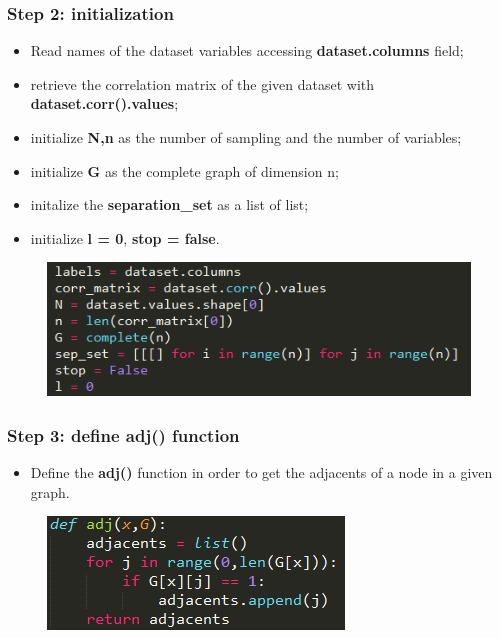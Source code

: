 \documentclass[xcolor ={table,usenames,dvipsnames}]{beamer}
\theoremstyle{definition}
\begin{document}
	\begin{frame}
\frametitle{Step 2: initialization}
\begin{itemize}
	\item Read names of the dataset variables accessing \textbf{dataset.columns} field;
	\item retrieve the correlation matrix of the given dataset with \textbf{dataset.corr().values};
	\item initialize \textbf{N,n} as the number of sampling and the number of variables;
	\item initialize \textbf{G} as the complete graph of dimension n;
	\item initalize the \textbf{separation\_set} as a list of list;
	\item initialize \textbf{l = 0}, \textbf{stop = false}.
\end{itemize}
	\begin{figure}[h!]
		\centering
		\includegraphics[scale=0.52]{img/initialization.PNG}
	\end{figure}

\end{frame}
\begin{frame}
\frametitle{Step 3: define adj() function}
\begin{itemize}
	\item Define the \textbf{adj()} function in order to get the adjacents of a node in a given graph.
\end{itemize}
	\begin{figure}[h!]
		\centering
		\includegraphics[scale=0.9]{img/adj.PNG}
	\end{figure}

\end{frame}
\end{document}

